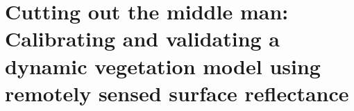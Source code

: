 \chapter{Cutting out the middle man: Calibrating and validating a dynamic vegetation model using remotely sensed surface reflectance}
\thispagestyle{myheadings}

\graphicspath{{4_edr/}}





%

